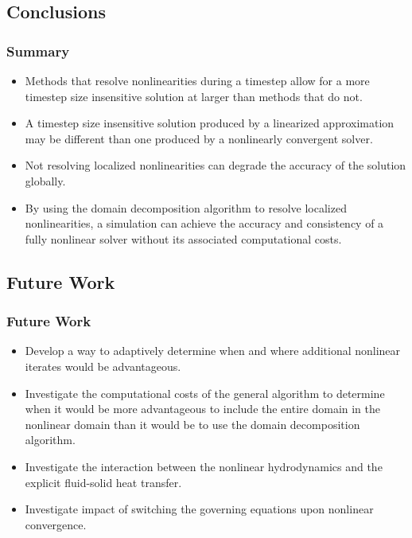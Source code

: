 \documentclass[compress,xcolor=table]{beamer}
\begin{document}
\subsection[Conclusions]{Conclusions}
\begin{frame}
\frametitle{Summary}

\begin{itemize}
\item{Methods that resolve nonlinearities during a timestep allow for a more timestep size insensitive solution at larger \dtmax{} than methods that do not.}
\item{A timestep size insensitive solution produced by a linearized approximation may be different than one produced by a nonlinearly convergent solver.}
\item{Not resolving localized nonlinearities can degrade the accuracy of the solution globally.}
\item{By using the domain decomposition algorithm to resolve localized nonlinearities, a simulation can achieve the accuracy and consistency of a fully nonlinear solver without its associated computational costs.}
\end{itemize}

\end{frame}
\subsection[Future Work]{Future Work}
\begin{frame}
\frametitle{Future Work}

\begin{itemize}
\item{Develop a way to adaptively determine when and where additional nonlinear iterates would be advantageous.}
\item{Investigate the computational costs of the general algorithm to determine when it would be more advantageous to include the entire domain in the nonlinear domain than it would be to use the domain decomposition algorithm.}
\item{Investigate the interaction between the nonlinear hydrodynamics and the explicit fluid-solid heat transfer.}
\item{Investigate impact of switching the governing equations upon nonlinear convergence.}
\end{itemize}

\end{frame}
\end{document}
